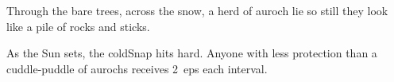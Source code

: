 \begin{boxtext}
  Through the bare trees, across the snow, a herd of auroch lie so still they look like a pile of rocks and sticks.
\end{boxtext}

\auroch

As the Sun sets, the \gls{coldSnap} hits hard.
Anyone with less protection than a cuddle-puddle of aurochs receives 2~\glspl{ep} each \gls{interval}.
